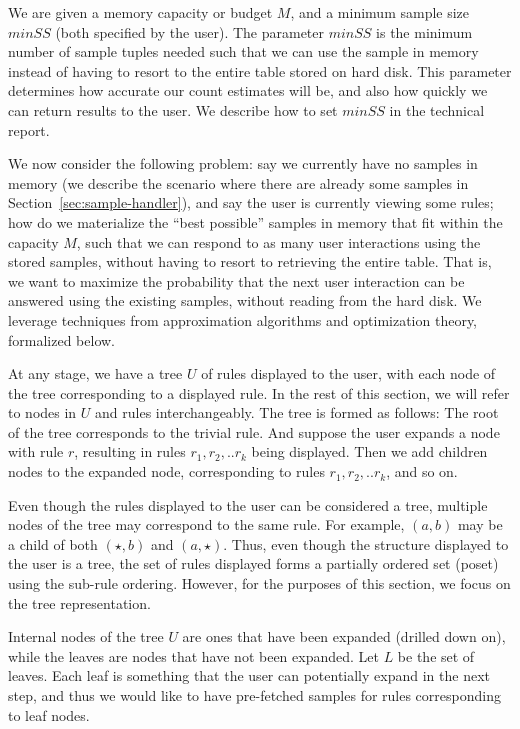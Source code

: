 We are given a memory capacity or budget $M$, and a minimum sample size $minSS$ (both specified by the user).
The parameter $minSS$ is the minimum number of sample tuples needed
such that we can use the sample in memory 
instead of having to resort to the entire table stored
on hard disk. 
This parameter determines how accurate our count estimates will be, and also
how quickly we can return results to the user. 
We describe how to set $minSS$ in the technical report.

We now consider the following problem: say we currently have no
samples in memory (we describe the scenario where there are already 
some samples in Section~\ref{sec:sample-handler}), and say the user is currently viewing some rules; how do we
materialize the ``best possible'' samples in memory that fit within the capacity $M$,
such that we can respond to as many user interactions using the stored samples,
without having to resort to retrieving the entire table.
That is, we want to maximize the probability that the next user interaction
can be answered using the existing samples, without reading from the hard disk. 
We leverage techniques from approximation algorithms and optimization theory, formalized
below.


At any stage, we have a tree $U$ of rules displayed to the user, 
with each node of the tree corresponding to a displayed rule. 
In the rest of this section, we will refer to nodes in $U$ and rules interchangeably.
The tree is formed as follows: The root of the tree corresponds to the trivial rule. 
And suppose the user expands a node with rule $r$, resulting in rules $r_1, r_2, .. r_k$ being displayed. 
Then we add children nodes to the expanded node, corresponding to rules $r_1, r_2, .. r_k$, and so on.

Even though the rules displayed to the user can be considered a tree, 
multiple nodes of the tree may correspond to the same rule. 
For example, $(a, b)$ may be a child of both $(\star, b)$ and $(a, \star)$.
Thus, even though the structure displayed to the user is a tree, 
the set of rules displayed forms a partially ordered set (poset) using the sub-rule ordering. 
However, for the purposes of this section, we focus on the tree representation.


Internal nodes of the tree $U$ are ones that have been expanded (drilled down on), 
while the leaves are nodes that have not been expanded. 
Let $L$ be the set of leaves. 
Each leaf is something that the user can potentially expand in the next step, and thus we would like to have pre-fetched samples for rules corresponding to leaf nodes.

